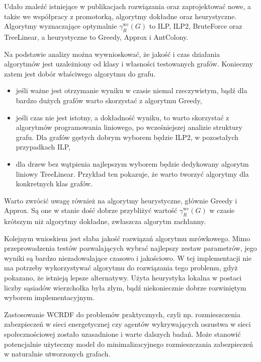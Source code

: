 Udało znaleźć istniejące w publikacjach rozwiązania oraz zaprojektować nowe, a także we współpracy z promotorką, algorytmy dokładne oraz heurystyczne. Algorytmy wyznaczające optymalnie $\gamma^{\text{wc}}_R(G)$ to ILP, ILP2, BruteForce oraz TreeLinear, a heurystyczne to Greedy, Approx i AntColony.

Na podstawie analizy można wywnioskować, że jakość i czas działania algorytmów jest uzależniony od klasy i własności testowanych grafów. Konieczny zatem jest dobór właściwego algorytmu do grafu.
\begin{itemize}
    \item jeśli ważne jest otrzymanie wyniku w czasie niemal rzeczywistym, bądź dla bardzo dużych grafów warto skorzystać z algorytmu Greedy,
    \item jeśli czas nie jest istotny, a dokładność wyniku, to warto skorzystać z algorytmów programowania liniowego, po wcześniejszej analizie struktury grafu. Dla grafów gęstych dobrym wyborem będzie ILP2, w pozostałych przypadkach ILP,
    \item dla drzew bez wątpienia najlepszym wyborem będzie dedykowany algorytm liniowy TreeLinear. Przykład ten pokazuje, że warto tworzyć algorytmy dla konkretnych klas grafów.
\end{itemize}

Warto zwrócić uwagę również na algorytmy heurystyczne, głównie Greedy i Approx. Są one w stanie dość dobrze przybliżyć wartość $\gamma^{\text{wc}}_R(G)$ w czasie krótszym niż algorytmy dokładne, zwłaszcza algorytm zachłanny.

Kolejnym wnioskiem jest słaba jakość rozwiązań algorytmu mrówkowego. Mimo przeprowadzenia testów pozwalających wybrać najlepszy zestaw parametrów, jego wyniki są bardzo niezadowalające czasowo i jakościowo. W tej implementacji nie ma potrzeby wykorzystywać algorytmu do rozwiązania tego problemu, gdyż pokazano, że istnieją lepsze alternatywy. Użyta heurystyka lokalna w postaci liczby sąsiadów wierzchołka była złym, bądź niekoniecznie dobrze rozwiniętym wyborem implementacyjnym.

Zastosowanie WCRDF do problemów praktycznych, czyli np. rozmieszczenia zabezpieczeń w sieci energetycznej czy agentów wykrywających oszustwa w sieci społecznościowej zostało uzasadnione i warte dalszych badań. Może stanowić potencjalnie użyteczny model do minimalizacyjnego rozmieszczania zabezpieczeń w naturalnie utworzonych grafach.

